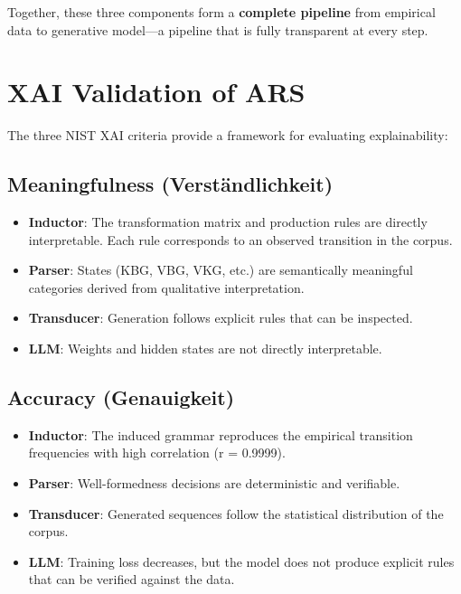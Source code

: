 \documentclass[12pt,a4paper]{article}
\begin{document}
Together, these three components form a \textbf{complete pipeline} from 
empirical data to generative model—a pipeline that is fully transparent at 
every step.

\section{XAI Validation of ARS}

The three NIST XAI criteria \citep{ortigossa2024xai} provide a framework for 
evaluating explainability:

\subsection{Meaningfulness (Verständlichkeit)}

\begin{itemize}
    \item \textbf{Inductor}: The transformation matrix and production rules are 
    directly interpretable. Each rule corresponds to an observed transition in 
    the corpus.
    \item \textbf{Parser}: States (KBG, VBG, VKG, etc.) are semantically 
    meaningful categories derived from qualitative interpretation.
    \item \textbf{Transducer}: Generation follows explicit rules that can be 
    inspected.
    \item \textbf{LLM}: Weights and hidden states are not directly interpretable.
\end{itemize}

\subsection{Accuracy (Genauigkeit)}

\begin{itemize}
    \item \textbf{Inductor}: The induced grammar reproduces the empirical 
    transition frequencies with high correlation (r = 0.9999).
    \item \textbf{Parser}: Well-formedness decisions are deterministic and 
    verifiable.
    \item \textbf{Transducer}: Generated sequences follow the statistical 
    distribution of the corpus.
    \item \textbf{LLM}: Training loss decreases, but the model does not produce 
    explicit rules that can be verified against the data.
\end{itemize}
\end{document}
